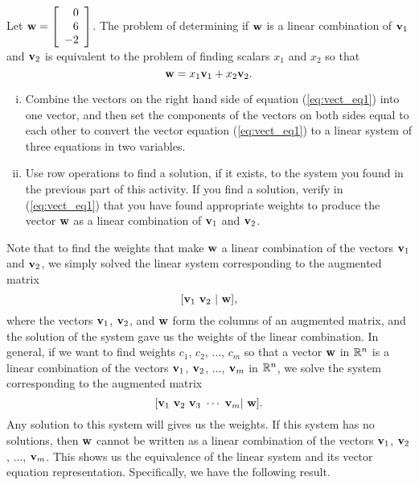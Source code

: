 \begin{activity}
    \item Let $\mathbf{w} = \left[ \begin{array}{r} 0 \\ 6 \\ -2 \end{array} \right]$. The problem of determining if $\mathbf{w}$ is a linear combination of $\mathbf{v}_1$ and $\mathbf{v}_2$ is equivalent to the problem of finding scalars $x_1$ and $x_2$ so that
    \begin{equation}
    \mathbf{w} = x_1 \mathbf{v}_1 + x_2 \mathbf{v}_2 . \label{eq:vect_eq1}
    \end{equation}
		\begin{enumerate}[i.]
		\item Combine the vectors on the right hand side of equation (\ref{eq:vect_eq1}) into one vector, and then set the components of the vectors on both sides equal to each other to convert the vector equation (\ref{eq:vect_eq1}) to a linear system of three equations in two variables.


		\item Use row operations to find a solution, if it exists, to the system you found in the previous part of this activity. If you find a solution, verify in (\ref{eq:vect_eq1}) that you have found appropriate weights to produce the vector $\mathbf{w}$ as a linear combination of $\mathbf{v}_1$ and $\mathbf{v}_2$.


		\end{enumerate}
		
    \ea
\end{activity}



Note that to find the weights that make $\mathbf{w}$ a linear combination of the vectors $\mathbf{v}_1$ and $\mathbf{v}_2$, we simply solved the linear system corresponding to the augmented matrix
\[[\mathbf{v}_1 \  \mathbf{v}_2 \ | \ \mathbf{w}],\]
where the vectors $\mathbf{v}_1$, $\mathbf{v}_2$, and $\mathbf{w}$ form the columns of an augmented matrix, and the solution of the system gave us the weights of the linear combination. In general, if we want to find weights $c_1$, $c_2$, $\ldots$, $c_m$ so that a vector $\mathbf{w}$ in $\mathbb{R}^n$ is a linear combination of the vectors $\mathbf{v}_1$, $\mathbf{v}_2$, $\ldots$, $\mathbf{v}_m$ in $\mathbb{R}^n$, we solve the system corresponding to the augmented matrix
\[[\mathbf{v}_1 \  \mathbf{v}_2 \  \mathbf{v}_3 \ \cdots \ \mathbf{v}_m | \ \mathbf{w}].\]
Any solution to this system will gives us the weights. If this system has no solutions, then $\mathbf{w}$ cannot be written as a linear combination of the vectors $\mathbf{v}_1$, $\mathbf{v}_2$, $\ldots$, $\mathbf{v}_m$. This shows us the equivalence of the linear system and its vector equation representation. Specifically, we have the following result.


